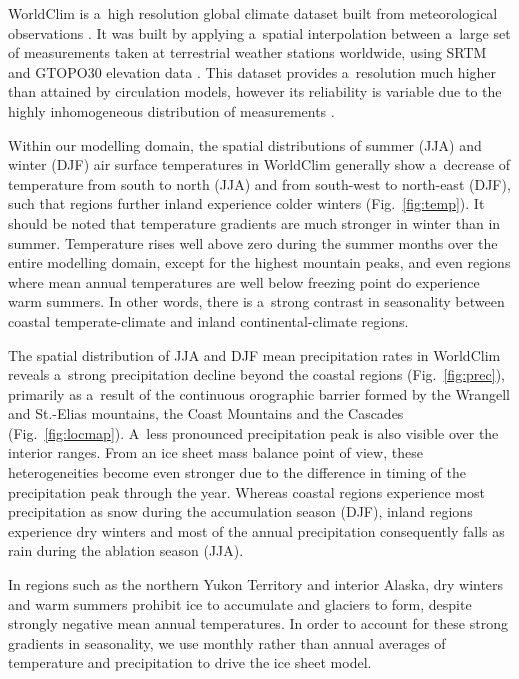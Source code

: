 \documentclass[tc, ms]{copernicus}
\begin{document}
WorldClim is a~high resolution global climate dataset built from meteorological observations \citep{data:worldclim}. It was built by applying a~spatial interpolation between a~large set of measurements taken at terrestrial weather stations worldwide, using SRTM \citep{data:srtm} and GTOPO30 elevation data \citep{data:gtopo30}. This dataset provides a~resolution much higher than attained by circulation models, however its reliability is variable due to the highly inhomogeneous distribution of measurements \citep{data:worldclim}.

Within our modelling domain, the spatial distributions of summer (JJA) and winter (DJF) air surface temperatures in WorldClim generally show a~decrease of temperature from south to north (JJA) and from south-west to north-east (DJF), such that regions further inland experience colder winters (Fig.~\ref{fig:temp}). It should be noted that temperature gradients are much stronger in winter than in summer. Temperature rises well above zero during the summer months over the entire modelling domain, except for the highest mountain peaks, and even regions where mean annual temperatures are well below freezing point do experience warm summers. In other words, there is a~strong contrast in seasonality between coastal temperate-climate and inland continental-climate regions.

The spatial distribution of JJA and DJF mean precipitation rates in WorldClim reveals a~strong precipitation decline beyond the coastal regions (Fig.~\ref{fig:prec}), primarily as a~result of the continuous orographic barrier formed by the Wrangell and St.-Elias mountains, the Coast Mountains and the Cascades (Fig.~\ref{fig:locmap}). A~less pronounced precipitation peak is also visible over the interior ranges. From an ice sheet mass balance point of view, these heterogeneities become even stronger due to the difference in timing of the precipitation peak through the year. Whereas coastal regions experience most precipitation as snow during the accumulation season (DJF), inland regions experience dry winters and most of the annual precipitation consequently falls as rain during the ablation season (JJA).

In regions such as the northern Yukon Territory and interior Alaska, dry winters and warm summers prohibit ice to accumulate and glaciers to form, despite strongly negative mean annual temperatures. In order to account for these strong gradients in seasonality, we use monthly rather than annual averages of temperature and precipitation to drive the ice sheet model.
\end{document}
